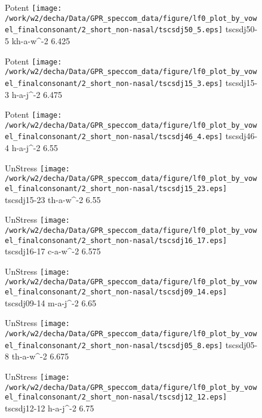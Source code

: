 \documentclass{article}
\begin{document}
\begin{figure}[t]
\begin{minipage}[b]{.24\textwidth}
\colorbox{Apricot}{Potent}
\centering
\texttt{[image: /work/w2/decha/Data/GPR\_speccom\_data/figure/lf0\_plot\_by\_vowel\_finalconsonant/2\_short\_non-nasal/tscsdj50\_5.eps]}
tscsdj50-5 kh-a-w\textasciicircum-2 6.425
\end{minipage}
\begin{minipage}[b]{.24\textwidth}
\colorbox{Apricot}{Potent}
\centering
\texttt{[image: /work/w2/decha/Data/GPR\_speccom\_data/figure/lf0\_plot\_by\_vowel\_finalconsonant/2\_short\_non-nasal/tscsdj15\_3.eps]}
tscsdj15-3 h-a-j\textasciicircum-2 6.475
\end{minipage}
\begin{minipage}[b]{.24\textwidth}
\colorbox{Apricot}{Potent}
\centering
\texttt{[image: /work/w2/decha/Data/GPR\_speccom\_data/figure/lf0\_plot\_by\_vowel\_finalconsonant/2\_short\_non-nasal/tscsdj46\_4.eps]}
tscsdj46-4 h-a-j\textasciicircum-2 6.55
\end{minipage}
\begin{minipage}[b]{.24\textwidth}
UnStress
\centering
\texttt{[image: /work/w2/decha/Data/GPR\_speccom\_data/figure/lf0\_plot\_by\_vowel\_finalconsonant/2\_short\_non-nasal/tscsdj15\_23.eps]}
tscsdj15-23 th-a-w\textasciicircum-2 6.55
\end{minipage}
\end{figure}

\begin{figure}[t]
\begin{minipage}[b]{.24\textwidth}
UnStress
\centering
\texttt{[image: /work/w2/decha/Data/GPR\_speccom\_data/figure/lf0\_plot\_by\_vowel\_finalconsonant/2\_short\_non-nasal/tscsdj16\_17.eps]}
tscsdj16-17 c-a-w\textasciicircum-2 6.575
\end{minipage}
\begin{minipage}[b]{.24\textwidth}
UnStress
\centering
\texttt{[image: /work/w2/decha/Data/GPR\_speccom\_data/figure/lf0\_plot\_by\_vowel\_finalconsonant/2\_short\_non-nasal/tscsdj09\_14.eps]}
tscsdj09-14 m-a-j\textasciicircum-2 6.65
\end{minipage}
\begin{minipage}[b]{.24\textwidth}
UnStress
\centering
\texttt{[image: /work/w2/decha/Data/GPR\_speccom\_data/figure/lf0\_plot\_by\_vowel\_finalconsonant/2\_short\_non-nasal/tscsdj05\_8.eps]}
tscsdj05-8 th-a-w\textasciicircum-2 6.675
\end{minipage}
\begin{minipage}[b]{.24\textwidth}
UnStress
\centering
\texttt{[image: /work/w2/decha/Data/GPR\_speccom\_data/figure/lf0\_plot\_by\_vowel\_finalconsonant/2\_short\_non-nasal/tscsdj12\_12.eps]}
tscsdj12-12 h-a-j\textasciicircum-2 6.75
\end{minipage}
\end{figure}
\end{document}
